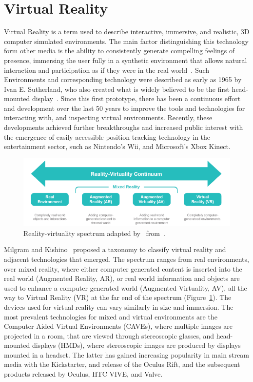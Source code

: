 \section{Virtual Reality}\label{sec:virtual-reality}

Virtual Reality is a term used to describe interactive, immersive, and realistic, 3D computer simulated environments.
The main factor distinguishing this technology form other media is the ability to consistently generate compelling
feelings of presence, immersing the user fully in a synthetic environment that allows natural interaction and
participation as if they were in the real world~\cite{Davis2014}.
Such Environments and corresponding technology were described as early as 1965 by Ivan E. Sutherland, who also created
what is widely believed to be the first head-mounted display~\cite{Sutherland1968}.
Since this first prototype, there has been a continuous effort and development over the last 50 years to improve the
tools and technologies for interacting with, and inspecting virtual environments.
Recently, these developments achieved further breakthroughs and increased public interest with the emergence of
easily accessible position tracking technology in the entertainment sector, such as Nintendo's Wii, and Microsoft's
Xbox Kinect.

\begin{figure}[h]
    \centering
    \includegraphics[width=\textwidth]{content/2_1_virtual_reality/img/reality-virtuality-continuum[Spivak2015]}
    \caption{Reality-virtuality spectrum adapted by~\cite{Spivak2015} from~\cite{Milgram1994}.}
    \label{fig:environment-spectrum}
\end{figure}

Milgram and Kishino~\cite{Milgram1994} proposed a taxonomy to classify virtual reality and adjacent technologies that
emerged.
The spectrum ranges from real environments, over mixed reality, where either computer generated content is inserted
into the real world (Augmented Reality, AR), or real world information and objects are used to enhance a computer
generated world (Augmented Virtuality, AV), all the way to Virtual Reality (VR) at the far end of the spectrum
(Figure~\ref{fig:environment-spectrum}).
The devices used for virtual reality can vary similarly in size and immersion.
The most prevalent technologies for mixed and virtual environments are the Computer Aided Virtual Environments (CAVEs),
where multiple images are projected in a room, that are viewed through stereoscopic glasses, and head-mounted
displays (HMDs), where stereoscopic images are produced by displays mounted in a headset.
The latter has gained increasing popularity in main stream media with the Kickstarter, and release of the Oculus Rift,
and the subsequent products released by Oculus, HTC VIVE, and Valve.

